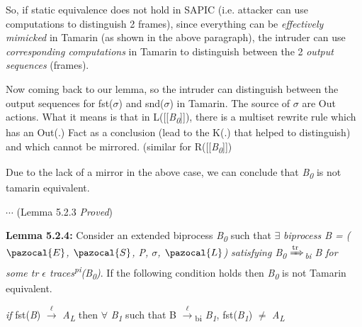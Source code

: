 \documentclass[11pt]{article}
\newcommand{\Sa}{\pazocal{S}}
\newcommand{\Lb}{\pazocal{L}}
\newcommand{\Ea}{\pazocal{E}}
\begin{document}
So, if static equivalence does not hold in SAPIC (i.e. attacker can use computations to distinguish 2 frames), since everything can be {\it effectively mimicked} in Tamarin (as shown in the above paragraph), the intruder can use {\it corresponding computations} in Tamarin to distinguish between the 2 {\it output sequences} (frames).\newline

Now coming back to our lemma, so the intruder can distinguish between the output sequences for fst($\sigma$) and snd($\sigma$) in Tamarin. The source of $\sigma$ are Out actions. What it means is that in L([[{\it B\textsubscript{0}}]]), there is a multiset rewrite rule which has an Out(.) Fact as a conclusion (lead to the K(.) that helped to distinguish) and which cannot be mirrored. (similar for R([[{\it B\textsubscript{0}}]])\newline

Due to the lack of a mirror in the above case, we can conclude that {\it B\textsubscript{0}} is not tamarin equivalent.

\hfill \hfill $\cdots$ (Lemma 5.2.3 {\it Proved})\newline

\vspace{6pt}
{\bf Lemma 5.2.4: }Consider an extended biprocess {\it B\textsubscript{0}} such that $\exists$ {\it biprocess B = ($\Ea$, $\Sa$, P, $\sigma$, $\Lb$) satisfying B\textsubscript{0} {$\xRightarrow[\text{}]{\text{tr}}$}\textsubscript{bi} B for some tr $\epsilon$ traces\textsuperscript{pi}(B\textsubscript{0})}. If the following condition holds then {\it B\textsubscript{0}} is not Tamarin equivalent.
\begin{center}
  {\it if} fst({\it B}) {$\xrightarrow[\text{}]{\text{$\ell$}}$} {\it A}\textsubscript{{\it L}} then {$\forall$} {\it B\textsubscript{1}} such that 
  B {$\xrightarrow[\text{}]{\text{$\ell$}}$}{\textsubscript{bi}} {\it B\textsubscript{1}}, fst({\it B\textsubscript{1}}) $\neq$ {\it A}\textsubscript{{\it L}}
\end{center}
\end{document}
